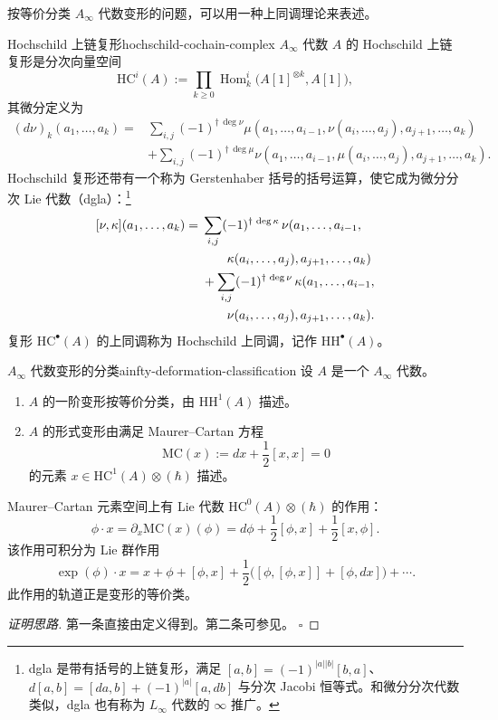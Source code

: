 按等价分类 $A_\infty$ 代数变形的问题，可以用一种上同调理论来表述。

\begin{definition}{Hochschild 上链复形}{hochschild-cochain-complex}
$A_\infty$ 代数 $A$ 的 Hochschild 上链复形是分次向量空间
\[
  \mathrm{HC}^{i}(A):=\prod_{k\geq0}\operatorname{Hom}_{k}^{i}\bigl(A[1]^{\otimes k},A[1]\bigr),
\]
其微分定义为
\begin{align*}
  (d\nu)_k(a_1,\ldots,a_k)
  ={}&\sum_{i,j}(-1)^{\dagger\,\deg\nu}
  \mu(a_1,\ldots,a_{i-1},\nu(a_i,\ldots,a_j),a_{j+1},\ldots,a_k)\\
  &+\sum_{i,j}(-1)^{\dagger\,\deg\mu}
  \nu(a_1,\ldots,a_{i-1},\mu(a_i,\ldots,a_j),a_{j+1},\ldots,a_k).
\end{align*}
Hochschild 复形还带有一个称为 Gerstenhaber 括号的括号运算，使它成为微分分次 Lie 代数（dgla）：\footnote{dgla 是带有括号的上链复形，满足 $[a,b]=(-1)^{|a||b|}[b,a]$、$d[a,b]=[da,b]+(-1)^{|a|}[a,db]$ 与分次 Jacobi 恒等式。和微分分次代数类似，dgla 也有称为 $L_\infty$ 代数的 $\infty$ 推广。}
\[
\begin{aligned}
  \relax[\nu,\kappa](a_1,\ldots,a_k)
  ={}&\sum_{i,j}(-1)^{\dagger\,\deg\kappa}\,
  \nu(a_1,\ldots,a_{i-1},\\
  &\qquad\kappa(a_i,\ldots,a_j),a_{j+1},\ldots,a_k)\\
  &+\sum_{i,j}(-1)^{\dagger\,\deg\nu}\,
  \kappa(a_1,\ldots,a_{i-1},\\
  &\qquad\nu(a_i,\ldots,a_j),a_{j+1},\ldots,a_k).
\end{aligned}
\]
复形 $\mathrm{HC}^{\bullet}(A)$ 的上同调称为 Hochschild 上同调，记作 $\mathrm{HH}^{\bullet}(A)$。
\end{definition}

\begin{theorem}{$A_\infty$ 代数变形的分类}{ainfty-deformation-classification}
设 $A$ 是一个 $A_\infty$ 代数。
\begin{enumerate}[label=(\roman*)]
  \item $A$ 的一阶变形按等价分类，由 $\mathrm{HH}^{1}(A)$ 描述。
  \item $A$ 的形式变形由满足 Maurer--Cartan 方程
  \[
    \mathrm{MC}(x):=dx+\frac12[x,x]=0
  \]
  的元素 $x\in\mathrm{HC}^{1}(A)\otimes(\hbar)$ 描述。
\end{enumerate}
Maurer--Cartan 元素空间上有 Lie 代数 $\mathrm{HC}^{0}(A)\otimes(\hbar)$ 的作用：
\[
  \phi\cdot x=\partial_x\mathrm{MC}(x)(\phi)
  =d\phi+\frac12[\phi,x]+\frac12[x,\phi].
\]
该作用可积分为 Lie 群作用
\[
  \exp(\phi)\cdot x
  =x+\phi+[\phi,x]+\frac12\bigl([\phi,[\phi,x]]+[\phi,d x]\bigr)+\cdots.
\]
此作用的轨道正是变形的等价类。
\end{theorem}
\begin{proof}[证明思路]
第一条直接由定义得到。第二条可参见。
\hfill$\square$
\end{proof}

